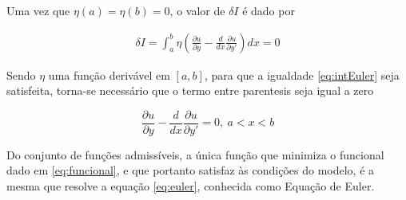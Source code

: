 Uma vez que $\eta(a) = \eta(b) = 0$, o valor de $ \delta I $ é dado por

\begin{equation}
\label{eq:intEuler}
\begin{split}
\delta I = \int_{a}^{b} \eta \left(\frac{\partial u}{\partial y} - \frac{d}{dx} 
\frac{\partial u}{\partial y'}\right)  dx = 0
\end{split}
\end{equation}

Sendo $ \eta $ uma função derivável em $ [a,b] $, para que a igualdade \ref{eq:intEuler} seja satisfeita, torna-se necessário que o termo entre parentesis seja igual a zero

\begin{equation}
\label{eq:euler}
\frac{\partial u}{\partial y} - \frac{d}{dx} 
\frac{\partial u}{\partial y'} = 0, \ a < x < b
\end{equation}

Do conjunto de funções admissíveis, a única função que minimiza o funcional dado em \ref{eq:funcional}, e que portanto satisfaz às condições do modelo, é a mesma que resolve a equação \ref{eq:euler}, conhecida como Equação de Euler.
